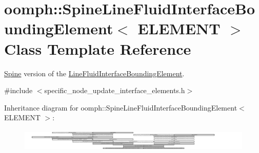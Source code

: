 \hypertarget{classoomph_1_1SpineLineFluidInterfaceBoundingElement}{}\section{oomph\+:\+:Spine\+Line\+Fluid\+Interface\+Bounding\+Element$<$ E\+L\+E\+M\+E\+NT $>$ Class Template Reference}
\label{classoomph_1_1SpineLineFluidInterfaceBoundingElement}


\hyperlink{classoomph_1_1Spine}{Spine} version of the \hyperlink{classoomph_1_1LineFluidInterfaceBoundingElement}{Line\+Fluid\+Interface\+Bounding\+Element}.  




{\ttfamily \#include $<$specific\+\_\+node\+\_\+update\+\_\+interface\+\_\+elements.\+h$>$}

Inheritance diagram for oomph\+:\+:Spine\+Line\+Fluid\+Interface\+Bounding\+Element$<$ E\+L\+E\+M\+E\+NT $>$\+:\begin{figure}[H]
\begin{center}
\leavevmode
\includegraphics[height=1.092683cm]{classoomph_1_1SpineLineFluidInterfaceBoundingElement}
\end{center}
\end{figure}
